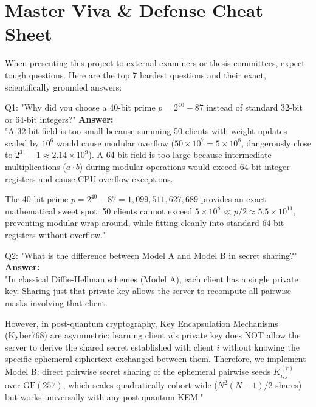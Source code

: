 \documentclass[11pt,a4paper]{report}
\begin{document}
\chapter{Master Viva & Defense Cheat Sheet}
\label{chap:viva}

When presenting this project to external examiners or thesis committees, expect tough questions. Here are the top 7 hardest questions and their exact, scientifically grounded answers:

\begin{infobox}{Q1: "Why did you choose a 40-bit prime $p = 2^{40}-87$ instead of standard 32-bit or 64-bit integers?"}
\textbf{Answer:} \\
"A 32-bit field is too small because summing 50 clients with weight updates scaled by $10^6$ would cause modular overflow ($50 \times 10^7 = 5 \times 10^8$, dangerously close to $2^{31}-1 \approx 2.14 \times 10^9$). A 64-bit field is too large because intermediate multiplications ($a \cdot b$) during modular operations would exceed 64-bit integer registers and cause CPU overflow exceptions.

The 40-bit prime $p = 2^{40}-87 = 1{,}099{,}511{,}627{,}689$ provides an exact mathematical sweet spot: 50 clients cannot exceed $5 \times 10^8 \ll p/2 \approx 5.5 \times 10^{11}$, preventing modular wrap-around, while fitting cleanly into standard 64-bit registers without overflow."
\end{infobox}

\begin{infobox}{Q2: "What is the difference between Model A and Model B in secret sharing?"}
\textbf{Answer:} \\
"In classical Diffie-Hellman schemes (Model A), each client has a single private key. Sharing just that private key allows the server to recompute all pairwise masks involving that client.

However, in post-quantum cryptography, Key Encapsulation Mechanisms (Kyber768) are asymmetric: learning client $u$'s private key does NOT allow the server to derive the shared secret established with client $i$ without knowing the specific ephemeral ciphertext exchanged between them. Therefore, we implement Model B: direct pairwise secret sharing of the ephemeral pairwise seeds $K_{i,j}^{(r)}$ over $\text{GF}(257)$, which scales quadratically cohort-wide ($N^2(N-1)/2$ shares) but works universally with any post-quantum KEM."
\end{infobox}
\end{document}
